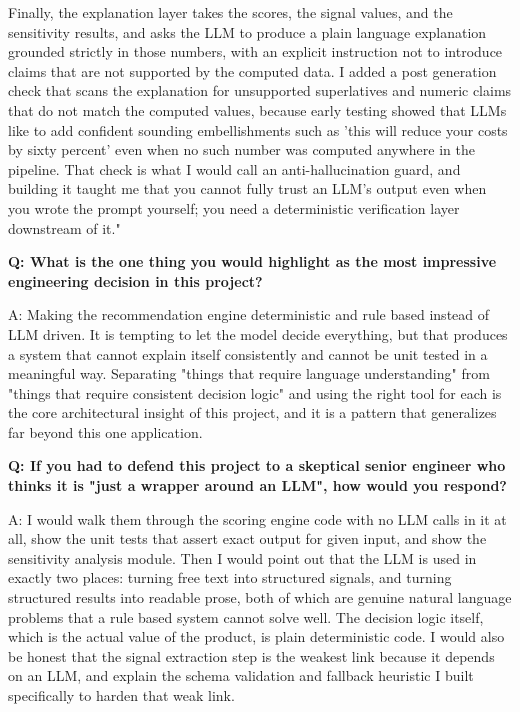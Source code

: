 \documentclass[11pt,a4paper]{report}
\begin{document}
\begin{notebox}
Finally, the explanation layer takes the scores, the signal values, and the sensitivity results, and asks the LLM to produce a plain language explanation grounded strictly in those numbers, with an explicit instruction not to introduce claims that are not supported by the computed data. I added a post generation check that scans the explanation for unsupported superlatives and numeric claims that do not match the computed values, because early testing showed that LLMs like to add confident sounding embellishments such as 'this will reduce your costs by sixty percent' even when no such number was computed anywhere in the pipeline. That check is what I would call an anti-hallucination guard, and building it taught me that you cannot fully trust an LLM's output even when you wrote the prompt yourself; you need a deterministic verification layer downstream of it."
\end{notebox}

\begin{qabox}
\textbf{Q: What is the one thing you would highlight as the most impressive engineering decision in this project?}

A: Making the recommendation engine deterministic and rule based instead of LLM driven. It is tempting to let the model decide everything, but that produces a system that cannot explain itself consistently and cannot be unit tested in a meaningful way. Separating "things that require language understanding" from "things that require consistent decision logic" and using the right tool for each is the core architectural insight of this project, and it is a pattern that generalizes far beyond this one application.

\textbf{Q: If you had to defend this project to a skeptical senior engineer who thinks it is "just a wrapper around an LLM", how would you respond?}

A: I would walk them through the scoring engine code with no LLM calls in it at all, show the unit tests that assert exact output for given input, and show the sensitivity analysis module. Then I would point out that the LLM is used in exactly two places: turning free text into structured signals, and turning structured results into readable prose, both of which are genuine natural language problems that a rule based system cannot solve well. The decision logic itself, which is the actual value of the product, is plain deterministic code. I would also be honest that the signal extraction step is the weakest link because it depends on an LLM, and explain the schema validation and fallback heuristic I built specifically to harden that weak link.
\end{qabox}
\end{document}
